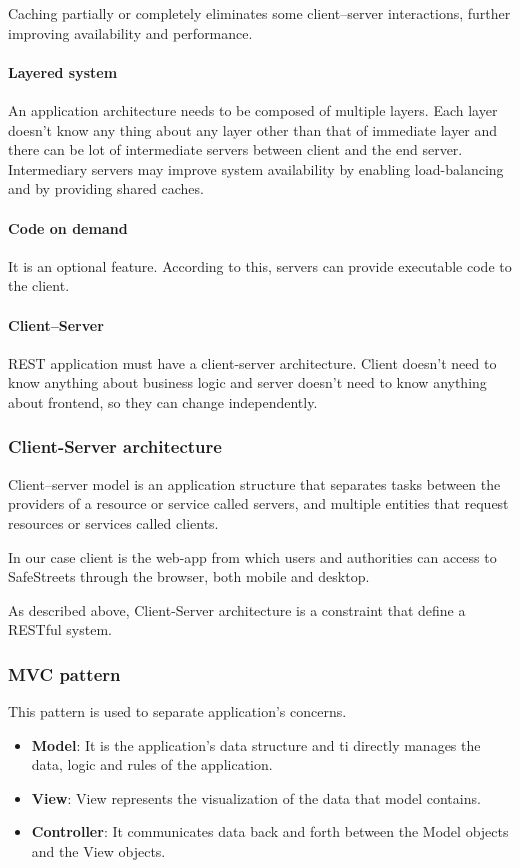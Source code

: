 Caching partially or completely eliminates some client–server interactions, further improving availability and performance.

\paragraph{Layered system}
An application architecture needs to be composed of multiple layers. Each layer doesn’t know any thing about any layer other than that of immediate layer and there can be lot of intermediate servers between client and the end server. Intermediary servers may improve system availability by enabling load-balancing and by providing shared caches.

\paragraph{Code on demand}
It is an optional feature. According to this, servers can provide executable code to the client.

\paragraph{Client–Server}
REST application must have a client-server architecture. Client doesn’t need to know anything about business logic and server doesn’t need to know anything about frontend, so they can change independently.


\subsubsection{Client-Server architecture}
Client–server model is an application structure that separates tasks between the providers of a resource or service called servers, and multiple entities that request resources or services called clients.

In our case client is the web-app from which users and authorities can access to SafeStreets through the browser, both mobile and desktop.

As described above, Client-Server architecture is a constraint that define a RESTful system.

\subsubsection{MVC pattern}
This pattern is used to separate application's concerns.
\begin{itemize}
	\item \textbf{Model}: It is the application's data structure and ti directly manages the data, logic and rules of the application.
	\item \textbf{View}: View represents the visualization of the data that model contains.
	\item \textbf{Controller}: It communicates data back and forth between the Model objects and the View objects.
\end{itemize}


